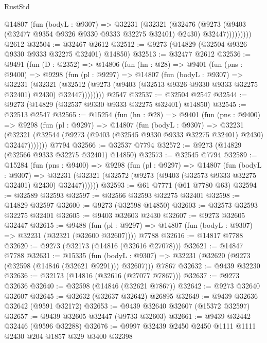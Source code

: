 \begin{lexlean}{RustStd}
\begin{coremodule}
{\begin{coremodule}
{{{{{{{{{{{{{{{{{{{{{{{{{{{{{{{{{{{{{{{{{{{{{{{{{{{{{{{            @14807
              (fun (bodyL : @9307) =>
              @32231
                (@32321
                  (@32476
                    (@9273
                      (@9403 (@32477 @9354 @9326 @9330 @9333 @32275 @32401) @2430)
                      @32447)))))))))
    @2612
@32504 := @32467 @2612
@32512 := @9273 (@14829 (@32504 @9326 @9330 @9333 @32275 @32401) @14850)
@32513 := @32477 @2612
@32536 := @9491
    (fun (D : @2352) =>
    @14806
      (fun (hn : @28) =>
      @9401
        (fun (pns : @9400) =>
        @9298
          (fun (pl : @9297) =>
          @14807
            (fun (bodyL : @9307) =>
            @32231
              (@32321
                (@32512 (@9273 (@9403 (@32513 @9326 @9330 @9333 @32275 @32401) @2430) @32447))))))))
    @2547
@32537 := @32504 @2547
@32544 := @9273 (@14829 (@32537 @9330 @9333 @32275 @32401) @14850)
@32545 := @32513 @2547
@32565 := @15254
    (fun (hn : @28) =>
    @9401
      (fun (pns : @9400) =>
      @9298
        (fun (pl : @9297) =>
        @14807
          (fun (bodyL : @9307) =>
          @32231
            (@32321 (@32544 (@9273 (@9403 (@32545 @9330 @9333 @32275 @32401) @2430) @32447)))))))
    @7794
@32566 := @32537 @7794
@32572 := @9273 (@14829 (@32566 @9333 @32275 @32401) @14850)
@32573 := @32545 @7794
@32589 := @15284
    (fun (pns : @9400) =>
    @9298
      (fun (pl : @9297) =>
      @14807
        (fun (bodyL : @9307) =>
        @32231 (@32321 (@32572 (@9273 (@9403 (@32573 @9333 @32275 @32401) @2430) @32447))))))
@32593 := @61 @7771 (@61 @7780 @63)
@32594 := @32589 @32593
@32597 := @32566 @32593 @32275 @32401
@32598 := @14829 @32597
@32600 := @9273 (@32598 @14850)
@32603 := @32573 @32593 @32275 @32401
@32605 := @9403 @32603 @2430
@32607 := @9273 @32605 @32447
@32615 := @9488
    (fun (pl : @9297) => @14807 (fun (bodyL : @9307) => @32231 (@32321 (@32600 @32607))))
    @7788
@32616 := @14817 @7788
@32620 := @9273 (@32173 (@14816 (@32616 @27078)))
@32621 := @14847 @7788
@32631 := @15335
    (fun (bodyL : @9307) => @32231 (@32620 (@9273 (@32598 (@14846 (@32621 @9291))) @32607)))
    @7867
@32632 := @9439 @32230
@32636 := @32173 (@14816 (@32616 (@27077 @7867)))
@32637 := @9273 @32636
@32640 := @32598 (@14846 (@32621 @7867))
@32642 := @9273 @32640 @32607
@32645 := @32632 (@32637 @32642) @26895
@32649 := @9439 @32636 @32642 (@9591 @32172)
@32653 := @9439 @32640 @32607 (@15372 @32597)
@32657 := @9439 @32605 @32447 (@9733 @32603)
@32661 := @9439 @32442 @32446 (@9596 @32288)
@32676 := @9997
    @32439
    @2450
    @2450
    @1111
    @1111
    @2430
    @204
    @1857
    @329
    @3400
    @32398
}}}}}}}}}}}}}}}}}}}}}}}}}}}}}}}}}}}}}}}}}}}}}}}}}}}}}}}
\end{coremodule}}
\end{coremodule}
\end{lexlean}
